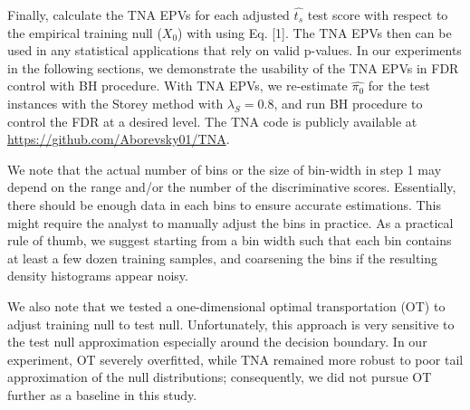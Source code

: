 \documentclass[10pt,letterpaper]{article}
\newcommand{\edit}[1]{#1} %
\begin{document}
	Finally, calculate the TNA EPVs for each adjusted $\hat{t_s}$ test score with respect to the empirical training null ($X_0$) with using Eq. [1].
	The TNA EPVs then can be used in any statistical applications that rely on valid p-values.
	In our experiments in the following sections, we demonstrate the usability of the TNA EPVs in FDR control with BH procedure.
	With TNA EPVs, we re-estimate $\hat{\pi_0}$ for the test instances with the Storey method with $\lambda_S= 0.8$, and run BH procedure to control the FDR at a desired level. \edit{The TNA code is publicly available at \url{https://github.com/Aborevsky01/TNA}.}
	
	We note that the actual number of bins or the size of bin-width in step 1 may depend on the range and/or the number of the discriminative scores.
	Essentially, there should be enough data in each bins to ensure accurate estimations.
	This might require the analyst to manually adjust the bins in practice.
	\edit{As a practical rule of thumb, we suggest starting from a bin width such that each bin contains at least a few dozen training samples, and coarsening the bins if the resulting density histograms appear noisy.}
	
	We also note that we tested a one-dimensional optimal transportation (OT) to adjust training null to test null.
	Unfortunately, this approach is very sensitive to the test null approximation especially around the decision boundary.
	In our experiment, OT severely overfitted, while TNA remained more robust to poor tail approximation of the null distributions\edit{; consequently, we did not pursue OT further as a baseline in this study.}
	
\end{document}
